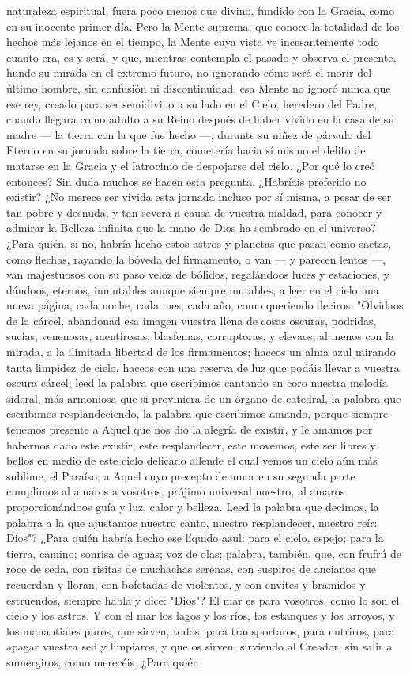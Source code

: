 \documentclass[12pt]{book} %
\begin{document}
naturaleza espiritual, fuera poco menos que divino, fundido con la Gracia, como en su inocente primer día. Pero la Mente suprema, que conoce la totalidad de los hechos más lejanos en el tiempo, la Mente cuya vista ve incesantemente todo cuanto era, es y será, y que, mientras contempla el pasado y observa el presente, hunde su mirada en el extremo futuro, no ignorando cómo será el morir del último hombre, sin confusión ni discontinuidad, esa Mente no ignoró nunca que ese rey, creado para ser semidivino a su lado en el Cielo, heredero del Padre, cuando llegara como adulto a su Reino después de haber vivido en la casa de su madre — la tierra con la que fue hecho —, durante su niñez de párvulo del Eterno en su jornada sobre la tierra, cometería hacia sí mismo el delito de matarse en la Gracia y el latrocinio de despojarse del cielo. ¿Por qué lo creó entonces? Sin duda muchos se hacen esta pregunta. ¿Habríais preferido no existir? ¿No merece ser vivida esta jornada incluso por sí misma, a pesar de ser tan pobre y desnuda, y tan severa a causa de vuestra maldad, para conocer y admirar la Belleza infinita que la mano de Dios ha sembrado en el universo? ¿Para quién, si no, habría hecho estos astros y planetas que pasan como saetas, como flechas, rayando la bóveda del firmamento, o van — y parecen lentos —, van majestuosos con su paso veloz de bólidos, regalándoos luces y estaciones, y dándoos, eternos, inmutables aunque siempre mutables, a leer en el cielo una nueva página, cada noche, cada mes, cada año, como queriendo deciros: "Olvidaos de la cárcel, abandonad esa imagen vuestra llena de cosas oscuras, podridas, sucias, venenosas, mentirosas, blasfemas, corruptoras, y elevaos, al menos con la mirada, a la ilimitada libertad de los firmamentos; haceos un alma azul mirando tanta limpidez de cielo, haceos con una reserva de luz que podáis llevar a vuestra oscura cárcel; leed la palabra que escribimos cantando en coro nuestra melodía sideral, más armoniosa que si proviniera de un órgano de catedral, la palabra que escribimos resplandeciendo, la palabra que escribimos amando, porque siempre tenemos presente a Aquel que nos dio la alegría de existir, y le amamos por habernos dado este existir, este resplandecer, este movemos, este ser libres y bellos en medio de este cielo delicado allende el cual vemos un cielo aún más sublime, el Paraíso; a Aquel cuyo precepto de amor en su segunda parte cumplimos al amaros a vosotros, prójimo universal nuestro, al amaros proporcionándoos guía y luz, calor y belleza. Leed la palabra que decimos, la palabra a la que ajustamos nuestro canto, nuestro resplandecer, nuestro reír: Dios"? ¿Para quién habría hecho ese líquido azul: para el cielo, espejo; para la tierra, camino; sonrisa de aguas; voz de olas; palabra, también, que, con frufrú de roce de seda, con risitas de muchachas serenas, con suspiros de ancianos que recuerdan y lloran, con bofetadas de violentos, y con envites y bramidos y estruendos, siempre habla y dice: "Dios"? El mar es para vosotros, como lo son el cielo y los astros. Y con el mar los lagos y los ríos, los estanques y los arroyos, y los manantiales puros, que sirven, todos, para transportaros, para nutriros, para apagar vuestra sed y limpiaros, y que os sirven, sirviendo al Creador, sin salir a sumergiros, como merecéis. ¿Para quién 
\end{document}
